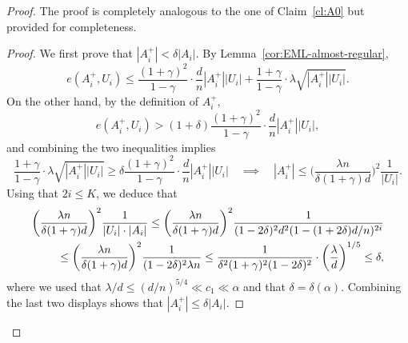 \documentclass[reqno,a4paper]{amsart}
\theoremstyle{definition}
\begin{document}
\begin{proof}
The proof is completely analogous to the one of Claim~\ref{cl:A0} but provided for completeness.

\begin{proof}
We first prove that $|A_i^+| < \delta |A_i|$. By Lemma~\ref{cor:EML-almost-regular},
\[
    e(A_i^+,U_i)
    \le 
    \frac{(1+\gamma)^2}{1-\gamma}\cdot\frac{d}{n}|A_i^+||U_i|
    +\frac{1+\gamma}{1-\gamma}\cdot \lambda \sqrt{|A_i^+||U_i|}.
\]
On the other hand, by the definition of $A_i^+$,
\[
    e(A_i^+,U_i)
    >
    (1+\delta)\frac{(1+\gamma)^2}{1-\gamma}\cdot\frac{d}{n}|A_i^+||U_i|,
\]
and combining the two inequalities implies
\begin{equation}\label{eq:displi1}
\frac{1+\gamma}{1-\gamma}\cdot \lambda \sqrt{|A_i^+||U_i|}
\ge 
\delta \frac{(1+\gamma)^2}{1-\gamma}\cdot\frac{d}{n}|A_i^+||U_i|\quad\implies\quad
|A_i^+|
\le
\bigg(\frac{\lambda n}{\delta (1+\gamma)d}\bigg)^2 \frac{1}{|U_i|}.
\end{equation}
Using that $2i\le K$, we deduce that
\begin{align}\label{eq:displi2}\notag
\bigg(\frac{\lambda n}{\delta (1+\gamma)d}\bigg)^2 \frac{1}{|U_i|\cdot |A_i|}\le \bigg(\frac{\lambda n}{\delta (1+\gamma)d}\bigg)^2 \frac{1}{(1-2\delta)^2 d^2(1-(1+2\delta)d/n)^{2i}}\\
\le \bigg(\frac{\lambda n}{\delta (1+\gamma)d}\bigg)^2\frac{1}{(1-2\delta)^2\lambda n}\le\frac{1}{\delta^2(1+\gamma)^2(1-2\delta)^2}\cdot \bigg(\frac{\lambda}{d}\bigg)^{1/5}\le \delta,
\end{align}
where we used that $\lambda/d\le (d/n)^{5/4}\ll c_1\ll \alpha$ and that $\delta=\delta(\alpha)$.
Combining the last two displays shows that $|A_i^+|\le \delta |A_i|$.


\end{proof}
\end{proof}
\end{document}
